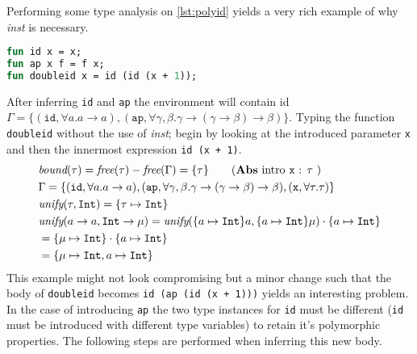 \documentclass[11pt,oneside,a4paper]{report}
\begin{document}
\begin{exmp}
    Performing some type analysis on \autoref{lst:polyid} yields a very rich example of why \textit{inst} is necessary.
    \newline
    \begin{minipage}{\textwidth}
\begin{lstlisting}[language=ML,caption={Polymorphic id},label={lst:polyid},mathescape=true]
fun id x = x;
fun ap x f = f x;
fun doubleid x = id (id (x + 1));
\end{lstlisting}
    \end{minipage}
    After inferring \texttt{id} and \texttt{ap} the environment will contain id $\Gamma = \{ (\texttt{id}, \forall a . a \rightarrow a), (\texttt{ap}, \forall \gamma,\beta . \gamma \rightarrow (\gamma \rightarrow \beta) \rightarrow \beta)\}$.
    Typing the function \texttt{doubleid} without the use of \textit{inst}; begin by looking at the introduced parameter \texttt{x} and then the innermost expression \texttt{id (x + 1)}. 
\begin{align}
    &\textit{bound}(\tau) = \textit{free}(\tau) - \textit{free}(\Gamma) = \{ \tau \} \tag{\textbf{Abs} intro \texttt{x} : $\tau$ }\\
    &\Gamma = \{ (\texttt{id}, \forall a . a \rightarrow a), (\texttt{ap}, \forall \gamma,\beta . \gamma \rightarrow (\gamma \rightarrow \beta) \rightarrow \beta), (\texttt{x}, \forall \tau . \tau) \}\\
    &\textit{unify}(\tau, \texttt{Int}) = \{ \tau \mapsto \texttt{Int} \}\\
    &\textit{unify}(a \rightarrow a, \texttt{Int} \rightarrow \mu) = \textit{unify}(\{ a \mapsto \texttt{Int} \}a, \{ a \mapsto \texttt{Int} \}\mu) \cdot \{ a \mapsto \texttt{Int} \}\\
    &= \{ \mu \mapsto \texttt{Int} \} \cdot \{ a \mapsto \texttt{Int} \} \tag*{}\\
    &= \{ \mu \mapsto \texttt{Int}, a \mapsto \texttt{Int} \} \tag*{}
    \label{eq:unifyres}
\end{align}
    This example might not look compromising but a minor change such that the body of \texttt{doubleid} becomes \texttt{id (ap (id (x + 1)))} yields an interesting problem.
    In the case of introducing \texttt{ap} the two type instances for \texttt{id} must be different (\texttt{id} must be introduced with different type variables) to retain it's polymorphic properties.
    The following steps are performed when inferring this new body.
\begin{align}

\end{align}
\end{exmp}
\end{document}
